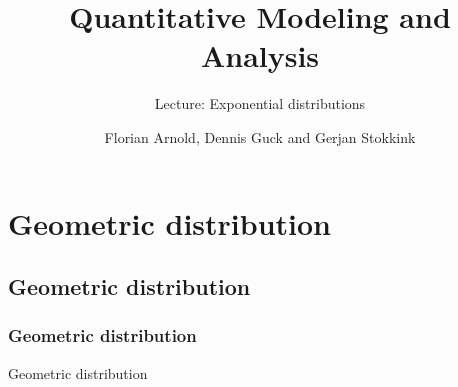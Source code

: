 \documentclass{beamer}
\title[QMA - Exponential distributions]{Quantitative Modeling and Analysis}
\subtitle{Lecture: Exponential distributions}
\author[FMT]{Florian Arnold, Dennis Guck and Gerjan Stokkink}
\institute[EWI-FMT]{Formal Methods and Tools Group,\\ University of Twente}
\date{}
\begin{document}
\begin{frame}
\titlepage
\end{frame} 


\begin{chapterframe}
	\tableofcontents[subsectionstyle=hide]
\end{chapterframe}

\section{Geometric distribution}

\begin{chapterframe}
	\tableofcontents[currentsection,subsectionstyle=hide]
\end{chapterframe}

\subsection{Geometric distribution}

\begin{frame}
	\frametitle{Geometric distribution}
	\begin{block}{Geometric distribution}
	\begin{figure}
        \centering
	\end{figure}
	\end{block}
\end{frame}
\end{document}
